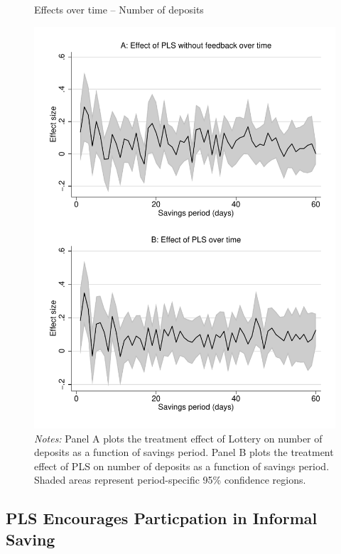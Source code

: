 \documentclass[11pt]{article}
\begin{document}
		\begin{figure}[ht]
		\caption{Effects over time -- Number of deposits}
		\includegraphics[width=\textwidth]{../../figures/line-timemobile_deposits.pdf}
		\caption*{\footnotesize \emph{Notes:} Panel A plots the treatment effect of Lottery on number of deposits as a function of savings period. Panel B plots the treatment effect of PLS on number of deposits as a function of savings period. Shaded areas represent period-specific 95\% confidence regions.}
		\end{figure}

	\subsection{PLS Encourages Particpation in Informal Saving}

\end{document}
